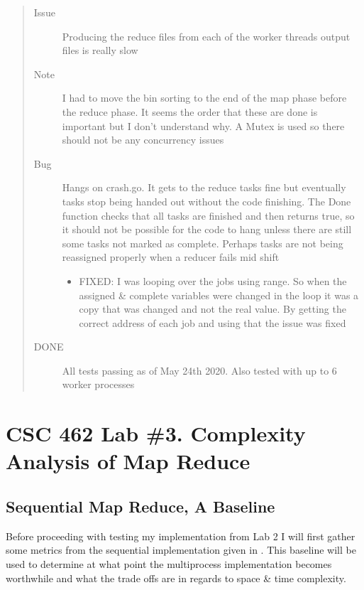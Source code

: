 \documentclass[letterpaper,10pt,english]{sphinxmanual}
\begin{document}
\begin{quote}
\begin{description}
\begin{itemize}
\begin{description}
\end{description}

\end{itemize}

\item[{Issue}] \leavevmode
Producing the reduce files from each of the worker threads output files is
really slow

\item[{Note}] \leavevmode
I had to move the bin sorting to the end of the map phase before the reduce phase.
It seems the order that these are done is important but I don’t understand why. A Mutex
is used so there should not be any concurrency issues

\item[{Bug}] \leavevmode
Hangs on crash.go. It gets to the reduce tasks fine but eventually
tasks stop being handed out without the code finishing.
The Done function checks that all tasks are finished and then returns true,
so it should not be possible for the code to hang unless there are still some tasks
not marked as complete. Perhaps tasks are not being re\sphinxhyphen{}assigned properly
when a reducer fails mid shift
\begin{itemize}
\item {} 
FIXED: I was looping over the jobs using range. So when the assigned \& complete variables were
changed in the loop it was a copy that was changed and not the real value. By getting the
correct address of each job and using that the issue was fixed

\end{itemize}

\item[{DONE}] \leavevmode
All tests passing as of May 24th 2020. Also tested with up to 6 worker processes

\end{description}\end{quote}


\chapter{CSC 462 Lab \#3. Complexity Analysis of Map Reduce}
\label{\detokenize{labs/lab3report:csc-462-lab-3-complexity-analysis-of-map-reduce}}\label{\detokenize{labs/lab3report::doc}}

\section{Sequential Map Reduce, A Baseline}
\label{\detokenize{labs/lab3report:sequential-map-reduce-a-baseline}}
Before proceeding with testing my implementation from Lab 2
I will first gather some metrics from
the sequential implementation given in .
This baseline will be used to determine at what point the
multi\sphinxhyphen{}process implementation becomes worthwhile and what
the trade offs are in regards to space \& time complexity.
\end{document}
